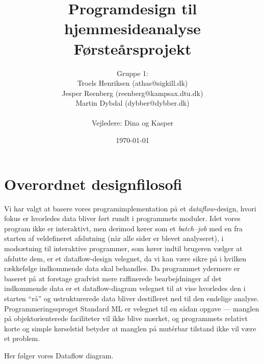 \documentclass[a4paper,oneside,article, titlepage]{memoir}
\title{Programdesign til hjemmesideanalyse  \\
       \small{Førsteårsprojekt}}
\author
{
  Gruppe 1:\\
  Troels Henriksen (athas@sigkill.dk)\\
  Jesper Reenberg (reenberg@kampsax.dtu.dk)\\
  Martin Dybdal (dybber@dybber.dk)\\ \\
  Vejledere: Dina og Kasper
}
\date{\today}
\begin{document}
\maketitle
\tableofcontents*
\newpage

\chapter{Overordnet designfilosofi}

Vi har valgt at basere vores programimplementation på et {\em
  dataflow}-design, hvori fokus er hvorledes data bliver ført rundt i
programmets moduler. Idet vores program ikke er interaktivt, men
derimod kører som et {\em batch--job} med en fra starten af
veldefineret afslutning (når alle sider er blevet analyseret), i
modsætning til interaktive programmer, som kører indtil brugeren
vælger at afslutte dem, er et dataflow-design velegnet, da vi kan være
sikre på i hvilken rækkefølge indkommende data skal behandles. Da
programmet ydermere er baseret på at foretage gradvist mere
raffinerede bearbejdninger af det indkommende data er et
dataflow-diagram velegnet til at vise hvorledes den i starten ``rå''
og ustrukturerede data bliver destilleret ned til den endelige
analyse. Programmeringssproget Standard ML er velegnet til en sådan
opgave --- manglen på objektorienterede faciliteter vil ikke blive
mærket, og programmets relativt korte og simple kørselstid betyder at
manglen på mutérbar tilstand ikke vil være et problem.

Her følger vores Dataflow diagram.
\end{document}
